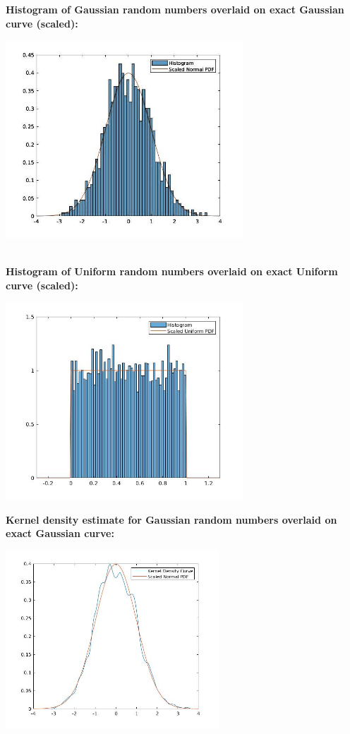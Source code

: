 \documentclass[12pt]{article}
\begin{document}
{\bf Histogram of Gaussian random numbers overlaid on exact Gaussian curve (scaled):}\\
\begin{center}
    \includegraphics[width=0.666\textwidth]{norm-hist-1000.jpg}
\end{center}
\\
{\bf Histogram of Uniform random numbers overlaid on exact Uniform curve (scaled):}\\
\begin{center}
\includegraphics[width=0.666\textwidth]{uniform-hist-1000.jpg}
\end{center}
\pagebreak
{\bf Kernel density estimate for Gaussian random numbers overlaid on exact Gaussian curve:}
\begin{center}
\includegraphics[width=0.6\textwidth]{norm-ks-1000.jpg}
\end{center}
\end{document}
